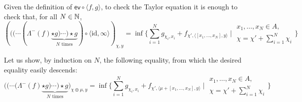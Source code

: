 Given the definition of $\mathsf{ev}\circ \langle f,g\rangle$, to check the Taylor equation it is enough to check that, for all $N\in \mathbb{N}$, 
$$
\left((( \cdots (\Lambda^{-}(f) \underbrace{\star g)\cdots )\star g}_{N\text{ times}})\circ \langle \mathrm{id}, \infty\rangle\right)_{\chi,y}=
\inf\Big \{ 
\sum_{i=1}^{N}g_{\chi_{i},x_{i}}+
f_{\chi', \langle [x_{1},\dots, x_{N}],y\rangle}
\mid 
\begin{matrix}
x_{1},\dots, x_{N}\in A,\\
\chi= \chi'+\sum_{i=1}^{N}\chi_{i}
\end{matrix}
\Big \}
$$

Let us show, by induction on $N$, the following equality, from which the desired equality easily descends:
$$
\big(( \cdots (\Lambda^{-}(f) \underbrace{\star g)\cdots )\star g}_{N\text{ times}}\big)_{\chi\oplus\mu,y}=
\inf\Big \{ 
\sum_{i=1}^{N}g_{\chi_{i},x_{i}}+
f_{\chi', \langle\mu+ [x_{1},\dots, x_{N}],y\rangle}
\mid 
\begin{matrix}
x_{1},\dots, x_{N}\in A,\\
\chi= \chi'+\sum_{i=1}^{N}\chi_{i}
\end{matrix}
\Big \}
$$
